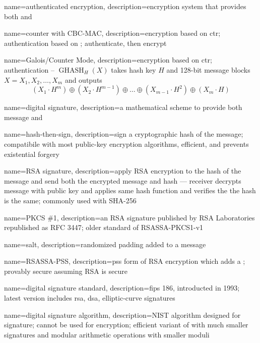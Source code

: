 {
    name={authenticated encryption},
    description={encryption system that provides both  and }
}

{
    name={counter with CBC-MAC},
    description={encryption based on \acrfull{ctr}; authentication based on ; authenticate, then encrypt}
}

{
    name={Galois/Counter Mode},
    description={encryption based on \acrfull{ctr}; authentication -- $\operatorname{GHASH}_H(X)$ takes hash key $H$ and 128-bit message blocks $X = X_1, X_2, \dots, X_m$ and outputs \[(X_1\cdot H^m)\oplus(X_2\cdot H^{m-1})\oplus\dots\oplus(X_{m-1}\cdot H^2)\oplus(X_m\cdot H)\]}
}

{
    name={digital signature},
    description={a mathematical scheme to provide both message  and }
}

{
    name={hash-then-sign},
    description={sign a cryptographic hash of the message; compatibile with most public-key encryption algorithms, efficient, and prevents existential forgery}
}

{
    name={RSA signature},
    description={apply RSA encryption to the hash of the message and send both the encrypted message and hash --- receiver decrypts message with public key and applies same hash function and verifies the the hash is the same; commonly used with SHA-256}
}

{
    name={PKCS \#1},
    description={an RSA signature published by RSA Laboratories republished as RFC 3447; older standard of RSASSA-PKCS1-v1}
}

{
    name={salt},
    description={randomized padding added to a message}
}

{
    name={RSASSA-PSS},
    description={\acrfull{pss} form of RSA encryption which adds a ; provably secure assuming RSA is secure}
}

{
    name={digital signature standard},
    description={\acrfull{fips} 186, introducted in 1993; latest version includes \acrshort{rsa}, \acrshort{dsa}, elliptic-curve signatures}
}

{
    name={digital signature algorithm},
    description={NIST algorithm designed for signature; cannot be used for encryption; efficient variant of  with much smaller signatures and modular arithmetic operations with smaller moduli}
}

